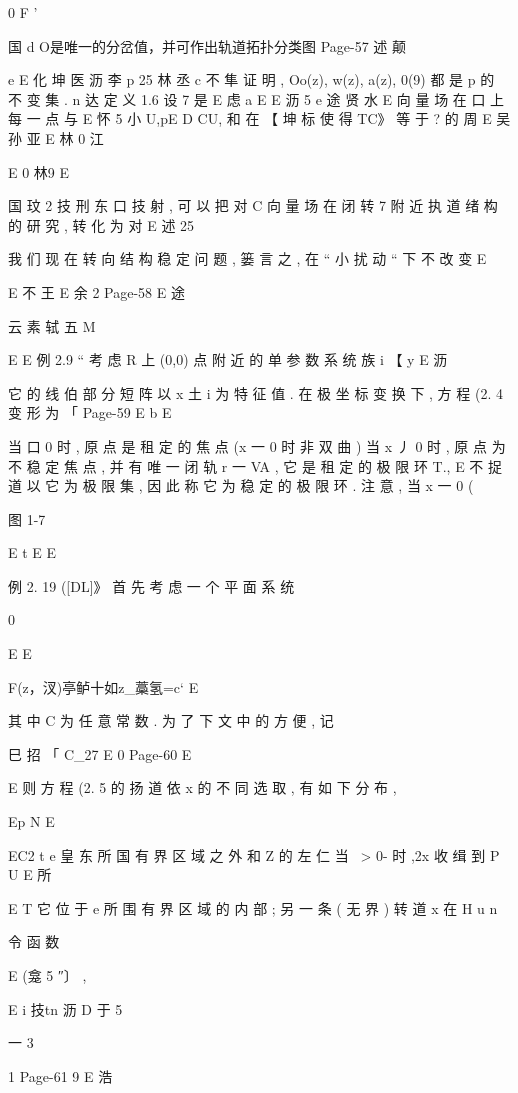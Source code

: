 { 0
F '

国 d O是唯一的分岔值，并可作出轨道拓扑分类图
Page-57
述 颠

e
E 化 坤 医 沥 李 p 25 林 丞
c
不 隼 证 明 , Oo(z), w(z), a(z), 0(9) 都 是 p 的 不 变 集 .
n
达
定 义 1.6 设 7 是
E 虑 a
E
E 沥 5
e 途 贤 水
E
向 量 场 在 口 上 每 一 点 与
E 怀 5 小
U,pE D CU, 和 在
【 坤 标
使 得 TC》 等 于 ? 的 周
E 吴 孙 亚
E 林 0 江

E 0 林9
E

国 玟 2 技 刑 东 口 技
射 , 可 以 把 对 C 向 量 场 在 闭 转 7 附 近 执 道 绪 构 的 研 究 , 转 化 为 对
E 述 25

我 们 现 在 转 向 结 构 稳 定 问 题 , 篓 言 之 , 在 “ 小 扰 动 “ 下 不 改 变
E

E 不 王
E 余 2
Page-58
E 途

云 素 轼
五 M

E
E
例 2.9 “ 考 虑 R 上 (0,0) 点 附 近 的 单 参 数 系 统 族
i
【 y
E 沥

它 的 线 伯 部 分 短 阵 以 x 土 i 为 特 征 值 . 在 极 坐 标 变 换 下 , 方 程 (2. 4
变 形 为 「
Page-59
E b E

当 口 0 时 , 原 点 是 租 定 的 焦 点 (x 一 0 时 非 双 曲 ) 当 x 丿 0 时 , 原
点 为 不 稳 定 焦 点 , 并 有 唯 一 闭 轨 r 一 VA , 它 是 租 定 的 极 限 环 T.,
E 不
捉 道 以 它 为 极 限 集 , 因 此 称 它 为 稳 定 的 极 限 环 . 注 意 , 当 x 一 0
(

图 1-7

E t
E
E

例 2. 19 ([DL]》 首 先 考 虑 一 个 平 面 系 统

0

E
E

F(z，汊)亭鲈十如z_藁氢=c` E

其 中 C 为 任 意 常 数 . 为 了 下 文 中 的 方 便 , 记

巳 招 「
C_27 E 0
Page-60
E

E
则 方 程 (2. 5 的 扬 道 依 x 的 不 同 选 取 , 有 如 下 分 布 ,

Ep N
E

EC2 t e 皇 东
所 国 有 界 区 域 之 外 和 Z 的 左 仁 当 ~> 0- 时 ,2x 收 缉 到 P U
E 所

E
T 它 位 于 e 所 围 有 界 区 域 的 内 部 ; 另 一 条 ( 无 界 ) 转 道 x 在 H
u n

令 函 数

E (龛 5 ″〕 ,

E i 技tn 沥
D
于
5

一 3

1
Page-61
9 E 浩

}
